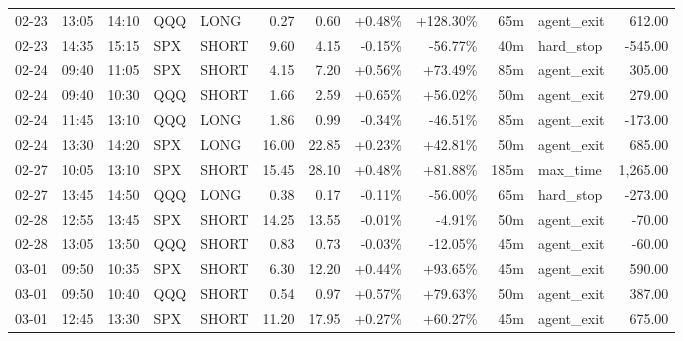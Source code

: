 \documentclass[11pt,a4paper,twoside]{article}
\begin{document}
\begin{center}
\begin{longtable}{>{\color{txtmain}}l l l l l r r r r r >{\color{txtmain}}l r}
02-23 & 13:05 & 14:10 & QQQ & LONG & 0.27 & 0.60 & \textcolor{wingreen}{+0.48\%} & \textcolor{wingreen}{+128.30\%} & 65m & agent\_exit & \textcolor{wingreen}{612.00} \\
02-23 & 14:35 & 15:15 & SPX & SHORT & 9.60 & 4.15 & \textcolor{lossred}{-0.15\%} & \textcolor{lossred}{-56.77\%} & 40m & hard\_stop & \textcolor{lossred}{-545.00} \\
02-24 & 09:40 & 11:05 & SPX & SHORT & 4.15 & 7.20 & \textcolor{wingreen}{+0.56\%} & \textcolor{wingreen}{+73.49\%} & 85m & agent\_exit & \textcolor{wingreen}{305.00} \\
02-24 & 09:40 & 10:30 & QQQ & SHORT & 1.66 & 2.59 & \textcolor{wingreen}{+0.65\%} & \textcolor{wingreen}{+56.02\%} & 50m & agent\_exit & \textcolor{wingreen}{279.00} \\
02-24 & 11:45 & 13:10 & QQQ & LONG & 1.86 & 0.99 & \textcolor{lossred}{-0.34\%} & \textcolor{lossred}{-46.51\%} & 85m & agent\_exit & \textcolor{lossred}{-173.00} \\
02-24 & 13:30 & 14:20 & SPX & LONG & 16.00 & 22.85 & \textcolor{wingreen}{+0.23\%} & \textcolor{wingreen}{+42.81\%} & 50m & agent\_exit & \textcolor{wingreen}{685.00} \\
02-27 & 10:05 & 13:10 & SPX & SHORT & 15.45 & 28.10 & \textcolor{wingreen}{+0.48\%} & \textcolor{wingreen}{+81.88\%} & 185m & max\_time & \textcolor{wingreen}{1,265.00} \\
02-27 & 13:45 & 14:50 & QQQ & LONG & 0.38 & 0.17 & \textcolor{lossred}{-0.11\%} & \textcolor{lossred}{-56.00\%} & 65m & hard\_stop & \textcolor{lossred}{-273.00} \\
02-28 & 12:55 & 13:45 & SPX & SHORT & 14.25 & 13.55 & \textcolor{lossred}{-0.01\%} & \textcolor{lossred}{-4.91\%} & 50m & agent\_exit & \textcolor{lossred}{-70.00} \\
02-28 & 13:05 & 13:50 & QQQ & SHORT & 0.83 & 0.73 & \textcolor{lossred}{-0.03\%} & \textcolor{lossred}{-12.05\%} & 45m & agent\_exit & \textcolor{lossred}{-60.00} \\
03-01 & 09:50 & 10:35 & SPX & SHORT & 6.30 & 12.20 & \textcolor{wingreen}{+0.44\%} & \textcolor{wingreen}{+93.65\%} & 45m & agent\_exit & \textcolor{wingreen}{590.00} \\
03-01 & 09:50 & 10:40 & QQQ & SHORT & 0.54 & 0.97 & \textcolor{wingreen}{+0.57\%} & \textcolor{wingreen}{+79.63\%} & 50m & agent\_exit & \textcolor{wingreen}{387.00} \\
03-01 & 12:45 & 13:30 & SPX & SHORT & 11.20 & 17.95 & \textcolor{wingreen}{+0.27\%} & \textcolor{wingreen}{+60.27\%} & 45m & agent\_exit & \textcolor{wingreen}{675.00} \\

\end{longtable}
\end{center}
\end{document}

